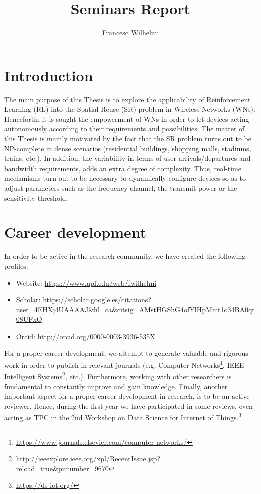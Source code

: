 \documentclass[12pt, a4paper,twoside]{article}
\title{Seminars Report}
\author{Francesc Wilhelmi}
\begin{document}
	\maketitle
	
	
	\section{Introduction}
	\label{section:introduction}		
	The main purpose of this Thesis is to explore the applicability of Reinforcement Learning (RL) into the Spatial Reuse (SR) problem in Wireless Networks (WNs). Henceforth, it is sought the empowerment of WNs in order to let devices acting autonomously according to their requirements and possibilities. The matter of this Thesis is mainly motivated by the fact that the SR problem turns out to be NP-complete in dense scenarios (residential buildings, shopping malls, stadiums, trains, etc.). In addition, the variability in terms of user arrivals/departures and bandwidth requirements, adds an extra degree of complexity. Thus, real-time mechanisms turn out to be necessary to dynamically configure devices so as to adjust parameters such as the frequency channel, the transmit power or the sensitivity threshold.
		
	\section{Career development}
	\label{section:career}
	In order to be active in the research community, we have created the following profiles:
	\begin{itemize}
		\item Website: \url{https://www.upf.edu/web/fwilhelmi}
		\item Scholar: \url{https://scholar.google.es/citations?user=4EHXj4UAAAAJ&hl=ca&citsig=AMstHGShG4ofYlHpMmt1o34BA0qt08UFxQ}
		\item Orcid: \url{http://orcid.org/0000-0003-3936-535X}
	\end{itemize}		
	For a proper career development, we attempt to generate valuable and rigorous work in order to publish in relevant journals (e.g. Computer Networks\footnote{\url{https://www.journals.elsevier.com/computer-networks/}}, IEEE Intelligent Systems\footnote{\url{http://ieeexplore.ieee.org/xpl/RecentIssue.jsp?reload=true&punumber=9670}}, etc.). Furthermore, working with other researchers is fundamental to constantly improve and gain knowledge. Finally, another important aspect for a proper career development in research, is to be an active reviewer. Hence, during the first year we have participated in some reviews, even acting as TPC in the 2nd Workshop on Data Science for Internet of Things.\footnote{\url{https://ds-iot.org/}}
	
\end{document}
